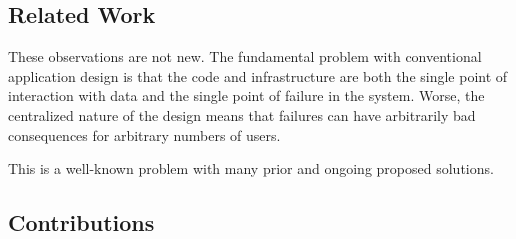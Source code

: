 \subsection{Related Work}

These observations are not new.  The fundamental problem with
conventional application design is that the code and infrastructure 
are both the single point of interaction with data and the single point of
failure in the system.  Worse, the centralized nature of the design
means that failures can have arbitrarily bad consequences for
arbitrary numbers of users.

This is a well-known problem with many prior and ongoing proposed solutions.  

\subsection{Contributions}

